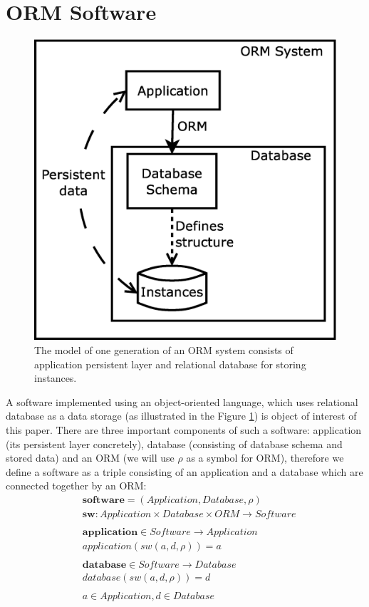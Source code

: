 \documentclass[11pt]{article}
\begin{document}
\section{ORM Software}
\label{sec:evoIntro}
\begin{figure}
\centering
	\includegraphics[scale=0.3]{./images/system}
	\caption{The model of one generation of an ORM system consists of application persistent layer and relational database for storing instances.}
\label{fig:appStructure}
\end{figure}
A software implemented using an object-oriented language, which uses relational database as a data storage (as illustrated in the Figure \ref{fig:appStructure}) is object of interest of this paper. There are three important components of such a software: application (its persistent layer concretely), database (consisting of database schema and stored data) and an ORM (we will use $\rho$ as a symbol for ORM), therefore we define a software as a triple consisting of an application and a database which are connected together by an ORM:
\begin{align*}
& \mathbf{software} = ( Application, Database, \rho )\\
& \mathbf{sw} : Application \times Database \times ORM \rightarrow  Software \\ 
\\
& \mathbf{application} \in Software \rightarrow Application \\
& application(sw(a, d, \rho)) = a \\ \\
& \mathbf{database} \in Software \rightarrow Database \\
& database(sw(a, d, \rho)) = d \\\\
& a \in Application, d \in Database
\end{align*}
\end{document}
